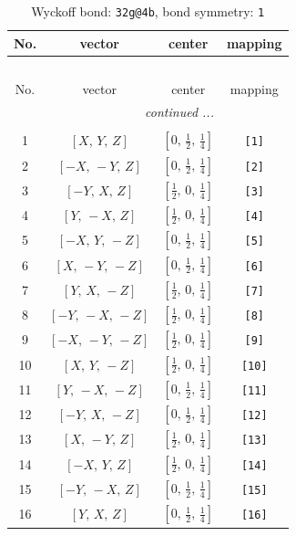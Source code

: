 \documentclass[fleqn,8pt]{jsarticle}
\begin{document}
\begin{longtable}{cccc}
\caption{Wyckoff bond: {\tt 32g@4b}, bond symmetry: {\tt 1}}
 \\
 \hline \hline
No. & vector & center & mapping \\ \hline \endfirsthead

\multicolumn{3}{l}{\tablename\ \thetable{}} \\
 \hline \hline
No. & vector & center & mapping \\ \hline \endhead

 \hline \hline
\multicolumn{3}{r}{\footnotesize\it continued ...} \\ \endfoot

 \hline \hline
\multicolumn{3}{r}{} \\ \endlastfoot

1 & $\left[ X,\, Y,\, Z \right]$ & $\left[ 0,\, \frac{1}{2},\, \frac{1}{4} \right]$ & {\tt [1]} \\ \hline
2 & $\left[ - X,\, - Y,\, Z \right]$ & $\left[ 0,\, \frac{1}{2},\, \frac{1}{4} \right]$ & {\tt [2]} \\ \hline
3 & $\left[ - Y,\, X,\, Z \right]$ & $\left[ \frac{1}{2},\, 0,\, \frac{1}{4} \right]$ & {\tt [3]} \\ \hline
4 & $\left[ Y,\, - X,\, Z \right]$ & $\left[ \frac{1}{2},\, 0,\, \frac{1}{4} \right]$ & {\tt [4]} \\ \hline
5 & $\left[ - X,\, Y,\, - Z \right]$ & $\left[ 0,\, \frac{1}{2},\, \frac{1}{4} \right]$ & {\tt [5]} \\ \hline
6 & $\left[ X,\, - Y,\, - Z \right]$ & $\left[ 0,\, \frac{1}{2},\, \frac{1}{4} \right]$ & {\tt [6]} \\ \hline
7 & $\left[ Y,\, X,\, - Z \right]$ & $\left[ \frac{1}{2},\, 0,\, \frac{1}{4} \right]$ & {\tt [7]} \\ \hline
8 & $\left[ - Y,\, - X,\, - Z \right]$ & $\left[ \frac{1}{2},\, 0,\, \frac{1}{4} \right]$ & {\tt [8]} \\ \hline
9 & $\left[ - X,\, - Y,\, - Z \right]$ & $\left[ \frac{1}{2},\, 0,\, \frac{1}{4} \right]$ & {\tt [9]} \\ \hline
10 & $\left[ X,\, Y,\, - Z \right]$ & $\left[ \frac{1}{2},\, 0,\, \frac{1}{4} \right]$ & {\tt [10]} \\ \hline
11 & $\left[ Y,\, - X,\, - Z \right]$ & $\left[ 0,\, \frac{1}{2},\, \frac{1}{4} \right]$ & {\tt [11]} \\ \hline
12 & $\left[ - Y,\, X,\, - Z \right]$ & $\left[ 0,\, \frac{1}{2},\, \frac{1}{4} \right]$ & {\tt [12]} \\ \hline
13 & $\left[ X,\, - Y,\, Z \right]$ & $\left[ \frac{1}{2},\, 0,\, \frac{1}{4} \right]$ & {\tt [13]} \\ \hline
14 & $\left[ - X,\, Y,\, Z \right]$ & $\left[ \frac{1}{2},\, 0,\, \frac{1}{4} \right]$ & {\tt [14]} \\ \hline
15 & $\left[ - Y,\, - X,\, Z \right]$ & $\left[ 0,\, \frac{1}{2},\, \frac{1}{4} \right]$ & {\tt [15]} \\ \hline
16 & $\left[ Y,\, X,\, Z \right]$ & $\left[ 0,\, \frac{1}{2},\, \frac{1}{4} \right]$ & {\tt [16]} \\
\end{longtable}
\end{document}
